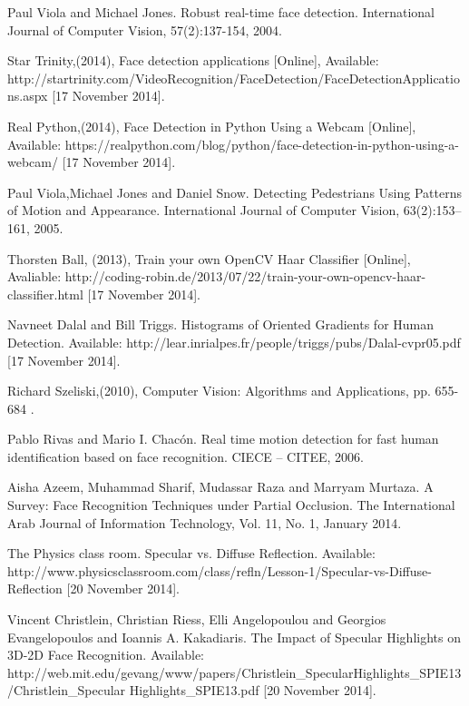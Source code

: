 \begin{thebibliography}{1}

Paul Viola and Michael Jones. Robust real-time face detection. International Journal of Computer Vision, 57(2):137-154, 2004.

Star Trinity,(2014), Face detection applications [Online], Available: http://startrinity.com/VideoRecognition/FaceDetection/FaceDetectionApplications.aspx  [17 November 2014].

Real Python,(2014), Face Detection in Python Using a Webcam [Online], Available: https://realpython.com/blog/python/face-detection-in-python-using-a-webcam/ [17 November 2014].

Paul Viola,Michael Jones and Daniel Snow. Detecting Pedestrians Using Patterns of Motion and Appearance. International Journal of Computer Vision, 63(2):153–161, 2005.

Thorsten Ball, (2013), Train your own OpenCV Haar Classifier [Online], Avaliable: http://coding-robin.de/2013/07/22/train-your-own-opencv-haar-classifier.html [17 November 2014].

Navneet Dalal and Bill Triggs. Histograms of Oriented Gradients for Human Detection. Available: http://lear.inrialpes.fr/people/triggs/pubs/Dalal-cvpr05.pdf [17 November 2014].

Richard Szeliski,(2010), Computer Vision: Algorithms and Applications, pp. 655-684 .

 Pablo Rivas and Mario I. Chacón.  Real time motion detection for fast human identification based on face recognition. CIECE – CITEE, 2006.

Aisha Azeem, Muhammad Sharif, Mudassar Raza and Marryam Murtaza. A Survey: Face Recognition Techniques under Partial Occlusion. The International Arab Journal of Information Technology, Vol. 11, No. 1, January 2014.

The Physics class room. Specular vs. Diffuse Reflection. Available: http://www.physicsclassroom.com/class/refln/Lesson-1/Specular-vs-Diffuse-Reflection [20 November 2014].

Vincent Christlein, Christian Riess, Elli Angelopoulou and Georgios Evangelopoulos and Ioannis A. Kakadiaris. The Impact of Specular Highlights on 3D-2D Face Recognition. Available: http://web.mit.edu/gevang/www/papers/Christlein\_SpecularHighlights\_SPIE13/Christlein\_Specular Highlights\_SPIE13.pdf [20 November 2014].

\end{thebibliography}